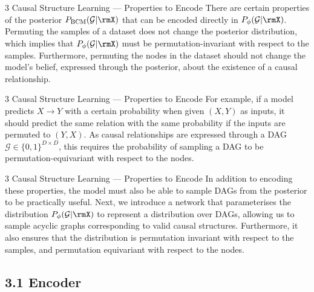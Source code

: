 \documentclass[aspectratio=169,10pt]{beamer}
\begin{document}
\begin{frame}{3 Causal Structure Learning --- Properties to Encode}
\small
There are certain properties of the posterior $P_{\text{BCM}} (\mathcal{G} | \rmX)$ that can be encoded directly in $P_{\phi}(\mathcal{G}| \rmX)$. Permuting the samples of a dataset does not change the posterior distribution, which implies that $P_{\phi}(\mathcal{G}| \rmX)$ must be permutation-invariant with respect to the samples. Furthermore, permuting the nodes in the dataset should not change the model's belief, expressed through the posterior, about the existence of a causal relationship.
\end{frame}

\begin{frame}{3 Causal Structure Learning --- Properties to Encode}
For example, if a model predicts $X \rightarrow Y$ with a certain probability when given $(X, Y)$ as inputs, it should predict the same relation with the same probability if the inputs are permuted to $(Y,X)$. As causal relationships are expressed through a DAG $\mathcal{G} \in \{0,1\}^{D \times D}$, this requires the probability of sampling a DAG to be permutation-equivariant with respect to the nodes.
\end{frame}

\begin{frame}{3 Causal Structure Learning --- Properties to Encode}
In addition to encoding these properties, the model must also be able to sample DAGs from the posterior to be practically useful. Next, we introduce a network that parameterises the distribution $P_{\phi}(\mathcal{G}| \rmX)$ to represent a distribution over DAGs, allowing us to sample acyclic graphs corresponding to valid causal structures. Furthermore, it also ensures that the distribution is permutation invariant with respect to the samples, and permutation equivariant with respect to the nodes.
\end{frame}

\subsection{3.1 Encoder}
\end{document}
